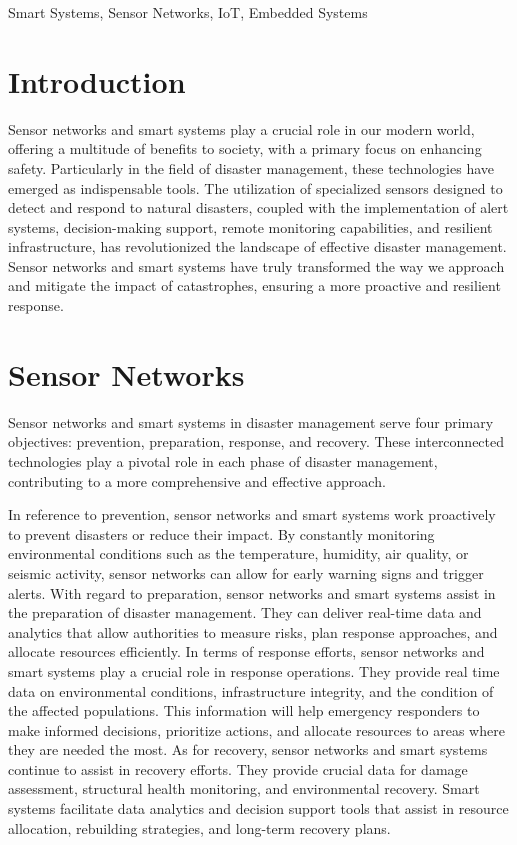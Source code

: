 \documentclass[conference]{IEEEtran}
\begin{document}
\begin{IEEEkeywords}
    Smart Systems, Sensor Networks, IoT, Embedded Systems\par
\end{IEEEkeywords}

\section{Introduction} %

Sensor networks and smart systems play a crucial role in our modern world, offering a multitude of benefits
to society, with a primary focus on enhancing safety. Particularly in the field of disaster management, these 
technologies have emerged as indispensable tools. The utilization of specialized sensors designed to detect 
and respond to natural disasters, coupled with the implementation of alert systems, decision-making support, 
remote monitoring capabilities, and resilient infrastructure, has revolutionized the landscape of effective 
disaster management. Sensor networks and smart systems have truly transformed the way we approach and mitigate 
the impact of catastrophes, ensuring a more proactive and resilient response.\par

\section{Sensor Networks} %

Sensor networks and smart systems in disaster management serve four primary objectives: prevention, preparation, 
response, and recovery. These interconnected technologies play a pivotal role in each phase of disaster management, 
contributing to a more comprehensive and effective approach.\par

In reference to prevention, sensor networks and smart systems work proactively to prevent disasters or reduce their 
impact. By constantly monitoring environmental conditions such as the temperature, humidity, air quality, or 
seismic activity, sensor networks can allow for early warning signs and trigger alerts. With regard to 
preparation, sensor networks and smart systems assist in the preparation of disaster management. They can 
deliver real-time data and analytics that allow authorities to measure risks, plan response approaches, and 
allocate resources efficiently. In terms of response efforts, sensor networks and smart systems play a crucial 
role in response operations. They provide real time data on environmental conditions, infrastructure integrity, 
and the condition of the affected populations. This information will help emergency responders to make informed 
decisions, prioritize actions, and allocate resources to areas where they are needed the most. As for recovery, 
sensor networks and smart systems continue to assist in recovery efforts. They provide crucial data for damage 
assessment, structural health monitoring, and environmental recovery. Smart systems facilitate data analytics 
and decision support tools that assist in resource allocation, rebuilding strategies, and long-term recovery 
plans.\par
\end{document}
